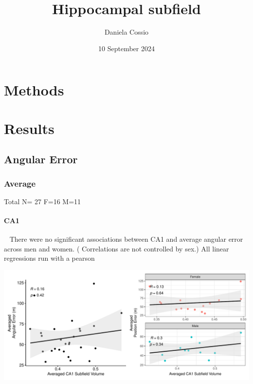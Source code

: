 \documentclass[
]{article}
\title{Hippocampal subfield}
\author{Daniela Cossio}
\date{10 September 2024}
\begin{document}
\maketitle

{
\setcounter{tocdepth}{3}
\tableofcontents
}
\newpage

\section{Methods}

\vspace{1cm}
\vspace{1cm}

\section{Results}
\vspace{1cm}
\subsection{Angular Error}
\vspace{1cm}

\subsubsection{Average}

Total N= 27 F=16 M=11

\paragraph{CA1}

~ There were no significant associations between CA1 and average angular
error across men and women. ( Correlations are not controlled by sex.)
All linear regressions run with a pearson \vspace{1cm}

\includegraphics{hippocampal_subfield_files/figure-latex/unnamed-chunk-1-1.pdf}
\end{document}
